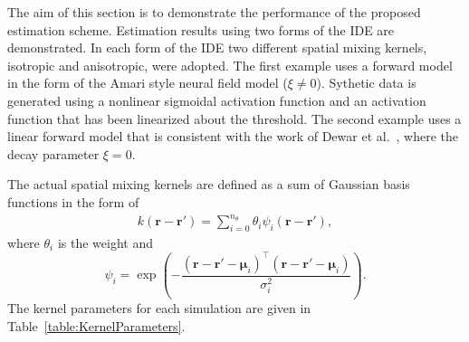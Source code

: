 \documentclass[10pt,twocolumn,twoside]{IEEEtran}
\begin{document}
The aim of this section is to demonstrate the performance of the proposed estimation scheme.
Estimation results using two forms of the IDE are demonstrated.
In each form of the IDE two different spatial mixing kernels, isotropic and anisotropic, were adopted.
The first example uses a forward model in the form of the Amari style neural field model ($\xi\neq 0$).
Sythetic data is generated using a nonlinear sigmoidal activation function and an activation function that has been linearized about the threshold.
The second example uses a linear forward model that is consistent with the work of Dewar et al.~\cite{Dewar2007}, where the decay parameter $\xi=0$.


The actual spatial mixing kernels are defined as a sum of Gaussian basis functions in the form of
\begin{align}\label{eq:sumofGaussians}
 k\left(\mathbf{r}-\mathbf{r}'\right)=\sum_{i=0}^{n_{\theta}}\theta_i\psi_i\left(\mathbf{r}-\mathbf{r}'\right), 
 \end{align}
where $\theta_i$ is the weight and
\begin{equation}\label{eq:Kernelbasis}
	\psi_i=\exp{\left(-\frac{(\mathbf{r}-\mathbf{r}'-\boldsymbol\mu_i)^\top(\mathbf{r}-\mathbf{r}'-\boldsymbol\mu_i)}{\sigma_i^2}\right)}.
\end{equation}
The kernel parameters for each simulation are given in Table~\ref{table:KernelParameters}.
\end{document}
